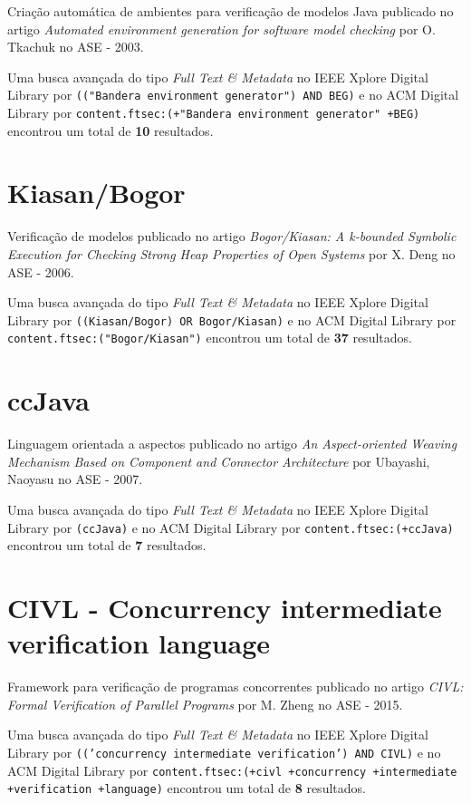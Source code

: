 Criação automática de ambientes para verificação de modelos Java
publicado no artigo
{\it Automated environment generation for software model checking}
por
O. Tkachuk
no
ASE
-
2003.


Uma busca avançada do tipo {\it Full Text \& Metadata} no IEEE Xplore Digital Library por
\texttt{(("Bandera environment generator") AND BEG)}
e no ACM Digital Library por
\texttt{content.ftsec:(+"Bandera environment generator" +BEG)}
encontrou um total de
{\bf 10}
resultados.

\section{Kiasan/Bogor}

Verificação de modelos
publicado no artigo
{\it Bogor/Kiasan: A k-bounded Symbolic Execution for Checking Strong Heap Properties of Open Systems}
por
X. Deng
no
ASE
-
2006.


Uma busca avançada do tipo {\it Full Text \& Metadata} no IEEE Xplore Digital Library por
\texttt{((Kiasan/Bogor) OR Bogor/Kiasan)}
e no ACM Digital Library por
\texttt{content.ftsec:("Bogor/Kiasan")}
encontrou um total de
{\bf 37}
resultados.

\section{ccJava}

Linguagem orientada a aspectos
publicado no artigo
{\it An Aspect-oriented Weaving Mechanism Based on Component and Connector Architecture}
por
Ubayashi, Naoyasu
no
ASE
-
2007.


Uma busca avançada do tipo {\it Full Text \& Metadata} no IEEE Xplore Digital Library por
\texttt{(ccJava)}
e no ACM Digital Library por
\texttt{content.ftsec:(+ccJava)}
encontrou um total de
{\bf 7}
resultados.

\section{CIVL - Concurrency intermediate verification language}

Framework para verificação de programas concorrentes
publicado no artigo
{\it CIVL: Formal Verification of Parallel Programs}
por
M. Zheng
no
ASE
-
2015.


Uma busca avançada do tipo {\it Full Text \& Metadata} no IEEE Xplore Digital Library por
\texttt{(('concurrency intermediate verification') AND CIVL)}
e no ACM Digital Library por
\texttt{content.ftsec:(+civl +concurrency +intermediate +verification +language)}
encontrou um total de
{\bf 8}
resultados.

